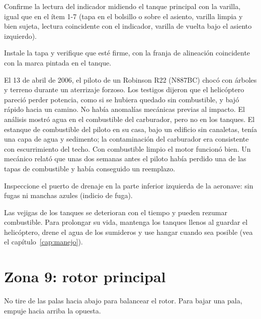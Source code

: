 Confirme la lectura del indicador midiendo el tanque principal con la varilla, igual que en el ítem 1-7 (tapa en el bolsillo o sobre el asiento, varilla limpia y bien sujeta, lectura coincidente con el indicador, varilla de vuelta bajo el asiento izquierdo).

Instale la tapa y verifique que esté firme, con la franja de alineación coincidente con la marca pintada en el tanque.

\begin{caso}
El 13 de abril de 2006, el piloto de un Robinson R22 (N887BC) chocó con árboles y terreno durante un aterrizaje forzoso. Los testigos dijeron que el helicóptero pareció perder potencia, como si se hubiera quedado sin combustible, y bajó rápido hacia un camino. No había anomalías mecánicas previas al impacto. El análisis mostró agua en el combustible del carburador, pero no en los tanques. El estanque de combustible del piloto en su casa, bajo un edificio sin canaletas, tenía una capa de agua y sedimento; la contaminación del carburador era consistente con escurrimiento del techo. Con combustible limpio el motor funcionó bien. Un mecánico relató que unas dos semanas antes el piloto había perdido una de las tapas de combustible y había conseguido un reemplazo.
\end{caso}

Inspeccione el puerto de drenaje en la parte inferior izquierda de la aeronave: sin fugas ni manchas azules (indicio de fuga).

\begin{nota}
Las vejigas de los tanques se deterioran con el tiempo y pueden rezumar combustible. Para prolongar su vida, mantenga los tanques llenos al guardar el helicóptero, drene el agua de los sumideros y use hangar cuando sea posible (vea el capítulo~\ref{cap:manejo}).
\end{nota}

\section{Zona 9: rotor principal}

\begin{precaucion}
No tire de las palas hacia abajo para balancear el rotor. Para bajar una pala, empuje hacia arriba la opuesta.
\end{precaucion}

